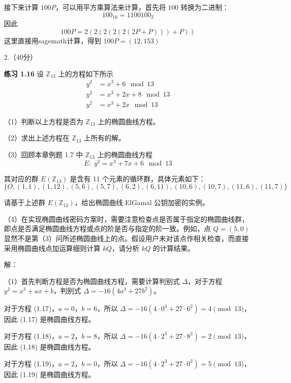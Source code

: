 \documentclass[12pt,a4paper]{article}
\begin{document}
接下来计算 $100P$，可以用平方乘算法来计算，首先将 $100$ 转换为二进制：
\[100_{10} = 1100100_2\]
因此
\[
100P = 2(2(2(2(2(2P+P)))+P))
\]
这里直接用sagemath计算，得到 $100P = (12,153)$

2.（40分）

\textbf{练习 1.16} 设 $\mathbb{Z}_{13}$ 上的方程如下所示
\begin{align}
y^2 &= x^3 + 6 \mod 13 \tag{1.17} \\
y^2 &= x^3 + 2x + 8 \mod 13 \tag{1.18} \\
y^2 &= x^3 + 2x \mod 13 \tag{1.19}
\end{align}

（1）判断以上方程是否为 $\mathbb{Z}_{13}$ 上的椭圆曲线方程。

（2）求出上述方程在 $\mathbb{Z}_{13}$ 上所有的解。

（3）回顾本章例题 1.7 中 $\mathbb{Z}_{13}$ 上的椭圆曲线方程
\[
E:\; y^2 = x^3 + 7x + 6 \mod 13
\]

其对应的群 $E(\mathbb{Z}_{13})$ 是含有 11 个元素的循环群，具体元素如下：
\[
\{O,(1,1),(1,12),(5,6),(5,7),(6,2),(6,11),(10,6),(10,7),(11,6),(11,7)\}
\]

请基于上述群 $E(\mathbb{Z}_{13})$，给出椭圆曲线 ElGamal 公钥加密的实例。

（4）在实现椭圆曲线密码方案时，需要注意检查点是否属于指定的椭圆曲线群，即点是否满足椭圆曲线方程或点的阶是否与指定的阶一致。例如，点 $Q=(5,0)$ 显然不是第（3）问所述椭圆曲线上的点。假设用户未对该点作相关检查，而直接采用椭圆曲线点加运算细则计算 $kQ$，请分析 $kQ$ 的计算结果。

解：

（1）首先判断方程是否为椭圆曲线方程，需要计算判别式 $\Delta$，对于方程 $y^2 = x^3 + ax + b$，判别式 $\Delta = -16(4a^3 + 27b^2)$。

对于方程 (1.17)，$a=0$，$b=6$，所以 $\Delta = -16(4 \cdot 0^3 + 27 \cdot 6^2) = 4 \pmod{13}$，因此 (1.17) 是椭圆曲线方程。

对于方程 (1.18)，$a=2$，$b=8$，所以 $\Delta = -16(4 \cdot 2^3 + 27 \cdot 8^2) = 2 \pmod{13}$，因此 (1.18) 是椭圆曲线方程。

对于方程 (1.19)，$a=2$，$b=0$，所以 $\Delta = -16(4 \cdot 2^3 + 27 \cdot 0^2) = 5 \pmod{13}$，因此 (1.19) 是椭圆曲线方程。
\end{document}
